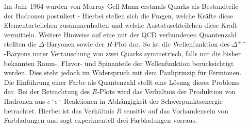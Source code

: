 Im Jahr 1964 wurden von Murray Gell-Mann erstmals Quarks als Bestandteile der Hadronen postuliert - Hierbei stellen sich die Fragen, welche Kräfte diese Elementarteilchen zusammenhalten und welche Austatuschteilchen diese Kraft vermitteln.
Weitere Hinweise auf eine mit der QCD verbundenen Quantenzahl stellten die $\Delta$-Baryonen sowie der $R$-Plot dar.
So ist die Wellenfunktion des $\Delta^{++}$-Baryons unter Vertauschung von zwei Quarks symmetrisch, falls nur die bisher bekannten Raum-, Flavor- und Spinanteile der Wellenfunktion berücksichtigt werden.
Dies steht jedoch im Widerspruch mit dem Pauliprinzip für Fermionen.
Die Einführung einer Farbe als Quantenzahl stellt eine Lösung dieses Problems dar.
Bei der Betrachtung des $R$-Plots wird das Verhältnis der Produktion von Hadronen aus $e^+ e^-$ Reaktionen in Abhängigkeit der Schwerpunktsenergie betrachtet.
Hierbei ist das Verhältnis $R$ sensitiv auf das Vorhandensein von Farbladungen und sagt experimentell drei Farbladungen vorraus.



